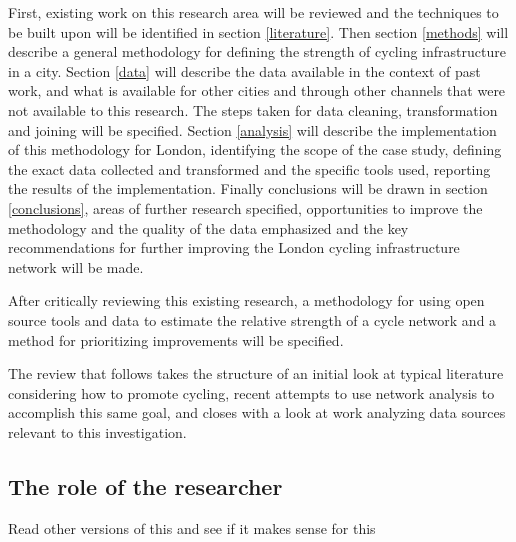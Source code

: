First, existing work on this research area will be reviewed and the techniques to be built upon will be identified in section \ref{literature}.  Then  section \ref{methods} will describe a general methodology for defining the strength of cycling infrastructure in a city. Section \ref{data} will describe the data available in the context of past work, and what is available for other cities and through other channels that were not available to this research. The steps taken for data cleaning, transformation and joining will be specified. Section \ref{analysis} will describe the implementation of this methodology for London, identifying the scope of the case study, defining the exact data collected and transformed and the specific tools used, reporting the results of the implementation. Finally conclusions will be drawn in section \ref{conclusions}, areas of further research specified, opportunities to improve the methodology and the quality of the data emphasized and the key recommendations for further improving the London cycling infrastructure network will be made. 

After critically reviewing this existing research, a methodology for using open source tools and data to estimate the relative strength of a cycle network and a method for prioritizing improvements will be specified.

The review that follows takes the structure of an initial look at typical literature considering how to promote cycling, recent attempts to use network analysis to accomplish this same goal, and closes with a look at work analyzing data sources relevant to this investigation. 

\subsection{The role of the researcher}

Read other versions of this and see if it makes sense for this 


